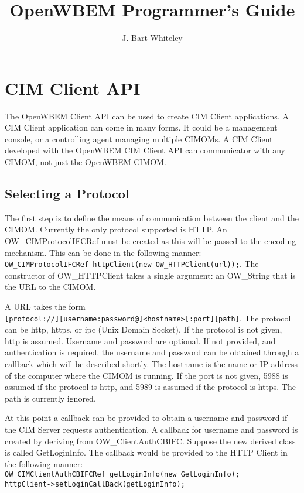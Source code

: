 \documentclass[letterpaper,10pt]{article}
\author {J. Bart Whiteley}
\title {OpenWBEM Programmer's Guide}
\begin{document}
\maketitle
\tableofcontents
\setlength{\parindent}{0pt}
\setlength{\parskip}{1ex plus 0.5ex minus 0.2ex}
\section{CIM Client API}
The OpenWBEM Client API can be used to create CIM Client applications.  
A CIM Client application can come in many forms.  It could be a management
console, or a controlling agent managing multiple CIMOMs.  A CIM Client 
developed with the OpenWBEM CIM Client API can communicator with any 
CIMOM, not just the OpenWBEM CIMOM.  
\subsection{Selecting a Protocol}
The first step is to define the means of communication between the
client and the CIMOM.  Currently the only protocol supported is 
HTTP.  An OW\_CIMProtocolIFCRef must be created as this will
be passed to the encoding mechanism.  This can be done in the
following manner: \\
\mbox{\texttt{OW\_CIMProtocolIFCRef httpClient(new OW\_HTTPClient(url));}}.
The constructor of 
OW\_HTTPClient takes a single argument: an OW\_String that is the 
URL to the CIMOM.  

A URL takes the form \\
\mbox{\texttt{[protocol://][username:password@]<hostname>[:port][path]}}.
The protocol can be http, https, or ipc (Unix Domain Socket).  If the
protocol is not given, http is assumed.  Username and password are optional.
If not provided, and authentication is required, the username
and password can be obtained through a callback which will be described 
shortly.  The hostname is the name or IP address of the computer where 
the CIMOM is running.  If the port is not given, 5988 is assumed if 
the protocol is http, and 5989 is assumed if the protocol is https.  
The path is currently ignored.  

At this point a callback can be provided to obtain a username and 
password if the CIM Server requests authentication.  A callback for 
username and password is created by deriving from OW\_ClientAuthCBIFC.
Suppose the new derived class is called GetLoginInfo.  The callback 
would be provided to the HTTP Client in the following manner: \\
\mbox{\texttt{OW\_CIMClientAuthCBIFCRef getLoginInfo(new GetLoginInfo);}}\\
\mbox{\texttt{httpClient->setLoginCallBack(getLoginInfo);}}
\end{document}
